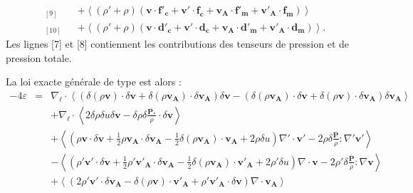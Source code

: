 \begin{equation}
{\begin{array}{lcl}
{}_{[9]}&&+  \left<\left(\rho' + \rho\right)\left(\boldsymbol{v} \cdot \boldsymbol{f'_c} + \boldsymbol{v'} \cdot \boldsymbol{f_c} + \boldsymbol{v_A} \cdot \boldsymbol{f'_m} + \boldsymbol{v'_A} \cdot \boldsymbol{f_m}\right) \right>\\
{}_{[10]}&&+ \left<\left(\rho' + \rho\right)\left(\boldsymbol{v} \cdot \boldsymbol{d'_c} + \boldsymbol{v'} \cdot \boldsymbol{d_c}+\boldsymbol{v_A} \cdot \boldsymbol{d'_m} + \boldsymbol{v'_A} \cdot \boldsymbol{d_m}\right)\right> .
\end{array}}
\end{equation} 
 Les lignes [7] et [8] contiennent les contributions des tenseurs de pression et de pression totale. 
 
La loi exacte générale de type  est alors : 
\begin{equation}
\label{eq:turb_cpg_elk} \boxed{
\begin{array}{lcl}
- 4\varepsilon &=& \nabla_{\boldsymbol{\ell}} \cdot \left<\left(\delta \left(\rho\boldsymbol{v}\right) \cdot \delta \boldsymbol{v}+ \delta \left(\rho\boldsymbol{v_A}\right) \cdot \delta \boldsymbol{v_A} \right) \delta \boldsymbol{v}  -\left(\delta \left(\rho\boldsymbol{v_A}\right) \cdot \delta \boldsymbol{v}  + \delta \left(\rho\boldsymbol{v}\right) \cdot \delta \boldsymbol{v_A}  \right) \delta \boldsymbol{v_A} \right>\\
&&+ \nabla_{\boldsymbol{\ell}} \cdot \left< 2\delta \rho  \delta u \delta \boldsymbol{v}-\delta \rho \delta \frac{ \overline{\boldsymbol{P_*}} }{\rho} \cdot \delta \boldsymbol{v} \right> \\
&& +\left< \left(\rho \boldsymbol{v} \cdot \delta \boldsymbol{v} +\frac{1}{2} \rho \boldsymbol{v_A} \cdot  \delta \boldsymbol{v_A} -\frac{1}{2} \delta \left(\rho \boldsymbol{v_A}\right) \cdot \boldsymbol{v_A} +2\rho \delta u\right) \nabla' \cdot \boldsymbol{v'} -2\rho \delta \frac{ \overline{\boldsymbol{P}} }{\rho}:\nabla' \boldsymbol{v'}\right>\\
 && -\left< \left(\rho' \boldsymbol{v'} \cdot \delta \boldsymbol{v}  + \frac{1}{2} \rho' \boldsymbol{v'_A} \cdot \delta \boldsymbol{v_A}  - \frac{1}{2} \delta \left(\rho \boldsymbol{v_A}\right) \cdot \boldsymbol{v'_A}  +2\rho' \delta u\right)\nabla \cdot \boldsymbol{v} - 2\rho' \delta \frac{ \overline{\boldsymbol{P}} }{\rho} :\nabla  \boldsymbol{v}\right>\\
&&+ \left<\left(2 \rho' \boldsymbol{v'} \cdot \delta \boldsymbol{v_A}- \delta \left(\rho \boldsymbol{v}\right) \cdot \boldsymbol{v'_A} + \rho' \boldsymbol{v'_A} \cdot \delta \boldsymbol{v}  \right)\nabla \cdot \boldsymbol{v_A}\right>\\

\end{array}}
\end{equation}
